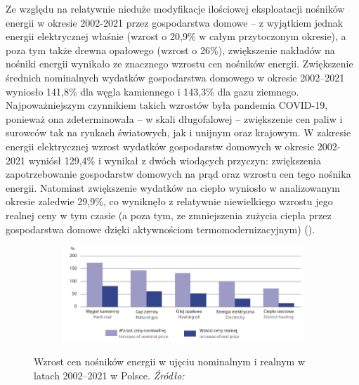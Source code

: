 \documentclass[polish, twoside, 12pt, a4paper]{article}
\theoremstyle{definition}
\theoremstyle{plain}
\theoremstyle{remark}
\begin{document}
Ze względu na relatywnie nieduże modyfikacje ilościowej eksploatacji nośników energii w okresie 2002-2021 przez gospodarstwa domowe – z wyjątkiem jednak energii elektrycznej właśnie (wzrost o 20,9\% w całym przytoczonym okresie), a poza tym także drewna opałowego (wzrost o 26\%), zwiększenie nakładów na nośniki energii wynikało ze znacznego wzrostu cen nośników energii. Zwiększenie średnich nominalnych wydatków gospodarstwa domowego w okresie 2002–2021 wyniosło 141,8\% dla węgla kamiennego i 143,3\% dla gazu ziemnego. Najpoważniejszym czynnikiem takich wzrostów była pandemia COVID-19, ponieważ ona zdeterminowała – w skali długofalowej – zwiększenie cen paliw i surowców tak na rynkach światowych, jak i unijnym oraz krajowym. W zakresie energii elektrycznej wzrost wydatków gospodarstw domowych w okresie 2002-2021 wyniósł 129,4\% i wynikał z dwóch wiodących przyczyn: zwiększenia zapotrzebowanie gospodarstw domowych na prąd oraz wzrostu cen tego nośnika energii. Natomiast zwiększenie wydatków na ciepło wyniosło w analizowanym okresie zaledwie 29,9\%, co wyniknęło z relatywnie niewielkiego wzrostu jego realnej ceny w tym czasie (a poza tym, ze zmniejszenia zużycia ciepła przez gospodarstwa domowe dzięki aktywnościom termomodernizacyjnym) (\cite{gus2023}). 

\begin{figure}[hbt]
  \centering

  \begin{subfigure}[t]{0.45\textwidth}
    \includegraphics[width=\textwidth]{./figure_10}
  \end{subfigure}

  \captionsetup{margin=10pt,font=small,labelfont=bf,width=.8\textwidth}

  \caption[Wzrost cen nośników energii w ujęciu nominalnym i realnym w latach 2002–2021 w Polsce.]{Wzrost cen nośników energii w ujęciu nominalnym i realnym w latach 2002–2021 w Polsce. \textit{Źródło:} \cite{gus2023}}\label{fig:x10}
\end{figure}
\end{document}
